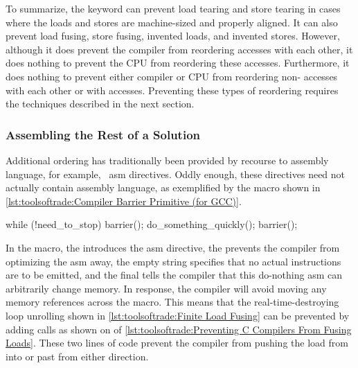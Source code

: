 To summarize, the  keyword can prevent load
tearing and store tearing in cases where the loads and stores are
machine-sized and properly aligned.
It can also prevent load fusing, store fusing, invented loads, and
invented stores.
However, although it does prevent the compiler from reordering 
accesses with each other, it does nothing to prevent the
CPU from reordering these accesses.
Furthermore, it does nothing to prevent either compiler or CPU from
reordering non- accesses with each other or with
 accesses.
Preventing these types of reordering requires the techniques described
in the next section.

\subsubsection{Assembling the Rest of a Solution}
\label{sec:toolsoftrade:Assembling the Rest of a Solution}

Additional ordering has traditionally been provided by recourse to
assembly language, for example, \GCC\ asm directives.
Oddly enough, these directives need not actually contain assembly language,
as exemplified by the  macro shown in
\cref{lst:toolsoftrade:Compiler Barrier Primitive (for GCC)}.

\begin{listing}
\begin{fcvlabel}
\begin{VerbatimL}[commandchars=\\\[\]]
while (!need_to_stop) {
	barrier(); \lnlbl[b1]
	do_something_quickly();
	barrier(); \lnlbl[b2]
}
\end{VerbatimL}
\end{fcvlabel}
\caption{Preventing C Compilers From Fusing Loads}
\label{lst:toolsoftrade:Preventing C Compilers From Fusing Loads}
\end{listing}

In the  macro, the  introduces the asm
directive, the  prevents the compiler from optimizing
the asm away, the empty string specifies that no actual instructions
are to be emitted, and the final  tells the compiler that
this do-nothing asm can arbitrarily change memory.
In response, the compiler will avoid moving any memory references across
the  macro.
This means that the real-time-destroying loop unrolling shown in
\cref{lst:toolsoftrade:Finite Load Fusing}
can be prevented by adding  calls as shown on
of
\cref{lst:toolsoftrade:Preventing C Compilers From Fusing Loads}.
These two lines of code prevent the compiler from pushing the load from
 into or past  from either
direction.

